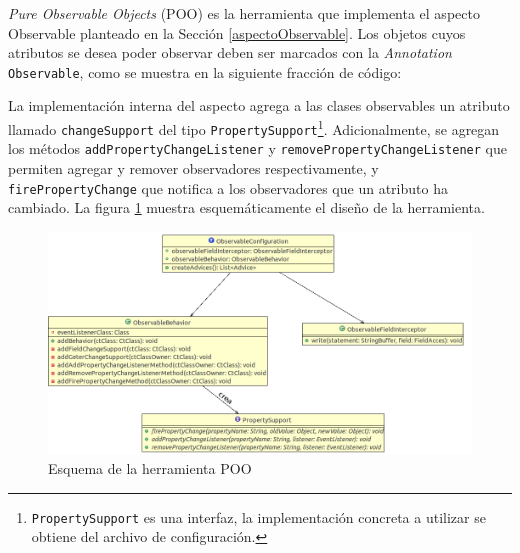 	\emph{Pure Observable Objects} (POO) es la herramienta que implementa el
	aspecto Observable planteado en la Sección \ref{aspectoObservable}.
	Los objetos cuyos atributos se desea poder observar deben ser marcados con
	la \emph{Annotation} \lstinline|Observable|, como
	se muestra en la siguiente fracción de código:
	
	
	La implementación interna del aspecto agrega a las clases observables un
	atributo llamado \lstinline|changeSupport| del tipo
	\lstinline|PropertySupport|\footnote{\lstinline|PropertySupport| es una
	interfaz, la implementación concreta a utilizar se obtiene del archivo de
	configuración.}.
	Adicionalmente, se agregan los métodos 
	\lstinline|addPropertyChangeListener| y
	\lstinline|removePropertyChangeListener| que permiten agregar 
	y remover observadores respectivamente, y \lstinline|firePropertyChange|
	que notifica a los observadores que un atributo ha cambiado.
	La figura \ref{umlpoo} muestra esquemáticamente el diseño de la herramienta.
	
	\begin{figure}[!htbp]
		\centering
		\includegraphics[scale=0.45]{img/poo}
	 	\caption{Esquema de la herramienta POO}
	 	\label{umlpoo}
	\end{figure}
	